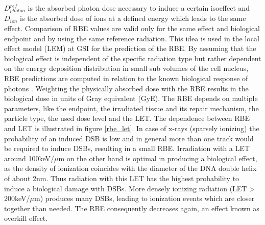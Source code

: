 $D^{ref}_{photon}$ is the absorbed photon dose necessary to induce a certain isoeffect and $D_{ion}$ is the absorbed dose of ions at a 
defined energy which leads to the same effect. Comparison of RBE values are valid only for the same effect and biological endpoint 
and by using the same reference radiation. This idea is used in the local effect model (LEM) at GSI for the prediction of the RBE. By 
assuming that the biological effect is independent of the specific radiation type but rather dependent on the energy deposition distribution 
in small sub volumes of the cell nucleus, RBE predictions are computed in relation to the known biological response of photons 
\cite{Krae03, Fried13}. Weighting the physically absorbed dose with the RBE results in the biological dose in units of Gray equivalent 
(GyE). \newline
\newline
The RBE depends on multiple parameters, like the endpoint, the irradiated tissue and its repair mechanism, the particle type, 
the used dose level and the LET. The dependence between RBE and LET is illustrated in figure \ref{rbe_let}. In case of x-rays (sparsely ionizing) 
the probability of an induced DSB is low and in general more than one track would be required to induce DSBs, resulting in a small RBE. 
Irradiation with a LET around 100keV/${\mu}$m on the other hand is optimal in producing a biological effect, as the 
density of ionization coincides with the diameter of the DNA double helix of about 2nm. Thus radiation with this LET has the 
highest probability to induce a biological damage with DSBs. More densely ionizing radiation (LET > 200keV/${\mu}$m) produces many DSBs, 
leading to ionization events which are closer together than needed. The RBE consequently decreases again, an 
effect known as overkill effect. 

